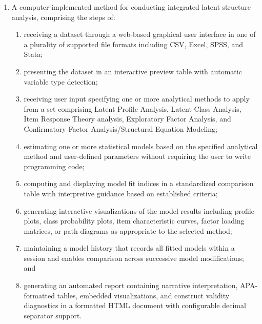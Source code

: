 \documentclass[12pt,a4paper]{article}
\begin{document}
\begin{enumerate}[leftmargin=3em, labelsep=1em, itemsep=12pt]
\item A computer-implemented method for conducting integrated latent structure analysis, comprising the steps of:
\begin{enumerate}[label=\alph*., leftmargin=2em, itemsep=2pt]
\item receiving a dataset through a web-based graphical user interface in one of a plurality of supported file formats including CSV, Excel, SPSS, and Stata;
\item presenting the dataset in an interactive preview table with automatic variable type detection;
\item receiving user input specifying one or more analytical methods to apply from a set comprising Latent Profile Analysis, Latent Class Analysis, Item Response Theory analysis, Exploratory Factor Analysis, and Confirmatory Factor Analysis/Structural Equation Modeling;
\item estimating one or more statistical models based on the specified analytical method and user-defined parameters without requiring the user to write programming code;
\item computing and displaying model fit indices in a standardized comparison table with interpretive guidance based on established criteria;
\item generating interactive visualizations of the model results including profile plots, class probability plots, item characteristic curves, factor loading matrices, or path diagrams as appropriate to the selected method;
\item maintaining a model history that records all fitted models within a session and enables comparison across successive model modifications; and
\item generating an automated report containing narrative interpretation, APA-formatted tables, embedded visualizations, and construct validity diagnostics in a formatted HTML document with configurable decimal separator support.
\end{enumerate}

\end{enumerate}
\end{document}

